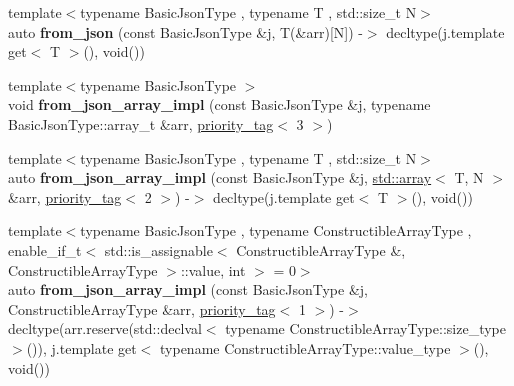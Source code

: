 \begin{DoxyCompactItemize}
\item 
\mbox{\label{namespacenlohmann_1_1detail_a7deb2db8eed6f1762373dde7a6595760}} 
{\footnotesize template$<$typename Basic\+Json\+Type , typename T , std\+::size\+\_\+t N$>$ }\\auto {\bfseries from\+\_\+json} (const Basic\+Json\+Type \&j, T(\&arr)\mbox{[}N\mbox{]}) -\/$>$ decltype(j.\+template get$<$ T $>$(), void())
\item 
\mbox{\label{namespacenlohmann_1_1detail_a40f7bb070a60e8ba14fffb9c117fcbd8}} 
{\footnotesize template$<$typename Basic\+Json\+Type $>$ }\\void {\bfseries from\+\_\+json\+\_\+array\+\_\+impl} (const Basic\+Json\+Type \&j, typename Basic\+Json\+Type\+::array\+\_\+t \&arr, \hyperlink{structnlohmann_1_1detail_1_1priority__tag}{priority\+\_\+tag}$<$ 3 $>$)
\item 
\mbox{\label{namespacenlohmann_1_1detail_aba0ce45ebb69fd2c7132a00f9a56b503}} 
{\footnotesize template$<$typename Basic\+Json\+Type , typename T , std\+::size\+\_\+t N$>$ }\\auto {\bfseries from\+\_\+json\+\_\+array\+\_\+impl} (const Basic\+Json\+Type \&j, \hyperlink{namespacenlohmann_1_1detail_a1ed8fc6239da25abcaf681d30ace4985af1f713c9e000f5d3f280adbd124df4f5}{std\+::array}$<$ T, N $>$ \&arr, \hyperlink{structnlohmann_1_1detail_1_1priority__tag}{priority\+\_\+tag}$<$ 2 $>$) -\/$>$ decltype(j.\+template get$<$ T $>$(), void())
\item 
\mbox{\label{namespacenlohmann_1_1detail_a7c06b590679604ecb0ea2a3b62bd254b}} 
{\footnotesize template$<$typename Basic\+Json\+Type , typename Constructible\+Array\+Type , enable\+\_\+if\+\_\+t$<$ std\+::is\+\_\+assignable$<$ Constructible\+Array\+Type \&, Constructible\+Array\+Type $>$\+::value, int $>$  = 0$>$ }\\auto {\bfseries from\+\_\+json\+\_\+array\+\_\+impl} (const Basic\+Json\+Type \&j, Constructible\+Array\+Type \&arr, \hyperlink{structnlohmann_1_1detail_1_1priority__tag}{priority\+\_\+tag}$<$ 1 $>$) -\/$>$ decltype(arr.\+reserve(std\+::declval$<$ typename Constructible\+Array\+Type\+::size\+\_\+type $>$()), j.\+template get$<$ typename Constructible\+Array\+Type\+::value\+\_\+type $>$(), void())
\item 

\end{DoxyCompactItemize}
